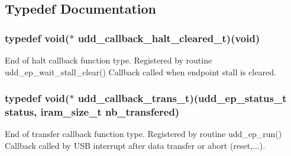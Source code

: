 \subsection{\-Typedef \-Documentation}
\hypertarget{group__udd__group_ga7ab8d43f0761ecfb4d48770ac4ebb661}{
\subsubsection[{udd\-\_\-callback\-\_\-halt\-\_\-cleared\-\_\-t}]{\setlength{\rightskip}{0pt plus 5cm}typedef void($\ast$ {\bf udd\-\_\-callback\-\_\-halt\-\_\-cleared\-\_\-t})(void)}}
\label{group__udd__group_ga7ab8d43f0761ecfb4d48770ac4ebb661}


\-End of halt callback function type. \-Registered by routine udd\-\_\-ep\-\_\-wait\-\_\-stall\-\_\-clear() \-Callback called when endpoint stall is cleared. 

\hypertarget{group__udd__group_gad866ed9444482edcf92a28dce807e3d3}{
\subsubsection[{udd\-\_\-callback\-\_\-trans\-\_\-t}]{\setlength{\rightskip}{0pt plus 5cm}typedef void($\ast$ {\bf udd\-\_\-callback\-\_\-trans\-\_\-t})({\bf udd\-\_\-ep\-\_\-status\-\_\-t} status, iram\-\_\-size\-\_\-t nb\-\_\-transfered)}}
\label{group__udd__group_gad866ed9444482edcf92a28dce807e3d3}


\-End of transfer callback function type. \-Registered by routine udd\-\_\-ep\-\_\-run() \-Callback called by \-U\-S\-B interrupt after data transfer or abort (reset,...). 


